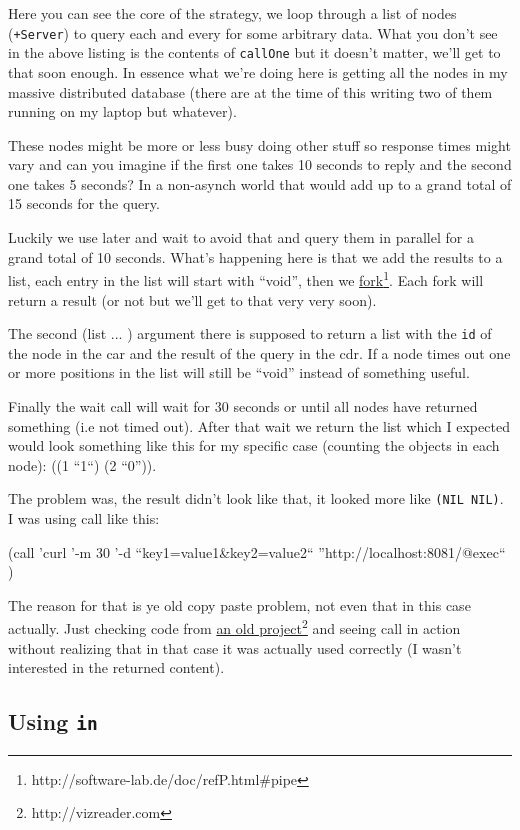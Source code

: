 Here you can see the core of the strategy, we loop through a list of
nodes (\texttt{+Server}) to query each and every for some arbitrary
data. What you don't see in the above listing is the contents of
\texttt{callOne} but it doesn't matter, we'll get to that soon enough.
In essence what we're doing here is getting all the nodes in my
massive distributed database (there are at the time of this writing
two of them running on my laptop but whatever).

These nodes might be more or less busy doing other stuff so response
times might vary and can you imagine if the first one takes 10 seconds
to reply and the second one takes 5 seconds? In a non-asynch world
that would add up to a grand total of 15 seconds for the query.

Luckily we use later and wait to avoid that and query them in parallel
for a grand total of 10 seconds. What's happening here is that we add
the results to a list, each entry in the list will start with
``void'', then we
\underline{fork}\footnote{http://software-lab.de/doc/refP.html\#pipe}.
Each fork will return a result (or not but we'll get to that very very
soon).

The second (list ... ) argument there is supposed to return a list
with the \texttt{id} of the node in the car and the result of the
query in the cdr. If a node times out one or more positions in the
list will still be ``void'' instead of something useful.

Finally the wait call will wait for 30 seconds or until all nodes have
returned something (i.e not timed out). After that wait we return the
list which I expected would look something like this for my specific
case (counting the objects in each node): ((1 ``1``) (2 ``0'')).

The problem was, the result didn't look like that, it looked more like
\texttt{(NIL NIL)}. I was using call like this: 

\begin{wideverbatim}
(call 'curl '-m 30 '-d
   ``key1=value1\&key2=value2`` ''http://localhost:8081/@exec`` )
\end{wideverbatim}

The reason for that is ye old copy paste problem, not even that in
this case actually. Just checking code from \underline{an old
  project}\footnote{http://vizreader.com} and seeing call in action
without realizing that in that case it was actually used correctly (I
wasn't interested in the returned content).

\subsection{Using \texttt{in}}
\label{sec:bla}

